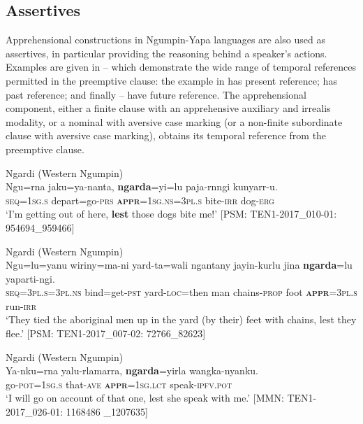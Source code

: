 \documentclass[output=paper,colorlinks,citecolor=brown]{langscibook}
\begin{document}
\subsection{Assertives}
\label{subsec:assertives}
\largerpage

Apprehensional constructions in Ngumpin-Yapa languages are also used as assertives, in particular providing the reasoning behind a speaker’s actions. Examples are given in -- which demonstrate the wide range of temporal references permitted in the preemptive clause: the example in  has present reference;  has past reference; and finally -- have future reference. The apprehensional component, either a finite clause with an apprehensive auxiliary and irrealis modality, or a nominal with aversive case marking (or a non-finite subordinate clause with aversive case marking), obtains its temporal reference from the preemptive clause.

\ea
\textnormal{Ngardi (Western Ngumpin)} \\
\gll Ngu=rna jaku=ya-nanta, \textbf{ngarda}=yi=lu paja-rnngi kunyarr-u. \\
\textsc{seq=1sg.s} depart=go\textsc{-prs} \textsc{\textbf{appr}=1sg.ns=3pl.s} bite-\textsc{irr} dog-\textsc{erg} \\
\glt `I'm getting out of here, \textbf{lest} those dogs bite me!' [PSM: TEN1-2017\_010-01: 954694\_959466]
\label{ex:bro82}
\z

\ea 
\textnormal{Ngardi (Western Ngumpin)} \\
\gll Ngu=lu=yanu wiriny=ma-ni yard-ta=wali ngantany jayin-kurlu jina \textbf{ngarda}=lu yaparti-ngi. \\
\textsc{seq=3pl.s=3pl.ns} bind=get-\textsc{pst} yard-\textsc{loc}=then man chains-\textsc{prop} foot \textsc{\textbf{appr}=3pl.s} run-\textsc{irr} \\
\glt `They tied the aboriginal men up in the yard (by their) feet with chains, lest they flee.' [PSM: TEN1-2017\_007-02: 72766\_82623]
\label{ex:bro83}
\z

\ea 
\textnormal{Ngardi (Western Ngumpin)} \\
\gll Ya-nku=rna yalu-rlamarra, \textbf{ngarda}=yirla wangka-nyanku. \\
go-\textsc{pot=1sg.s} that-\textsc{ave} \textsc{\textbf{appr}=1sg.lct} speak-\textsc{ipfv.pot} \\
\glt `I will go on account of that one, lest she speak with me.' [MMN: TEN1-2017\_026-01: 1168486 \_1207635]
\label{ex:bro84}
\z
\end{document}
